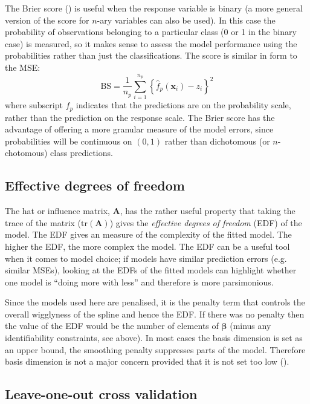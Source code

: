 The Brier score (\cite{brier50}) is useful when the response variable is binary (a more general version of the score for $n$-ary variables can also be used). In this case the probability of observations belonging to a particular class (0 or 1 in the binary case) is measured, so it makes sense to assess the model performance using the probabilities rather than just the classifications. The score is similar in form to the MSE:
\begin{equation}
\text{BS} = \frac{1}{n_p} \sum_{i=1}^{n_p} \left \{\hat{f}_p(\mathbf{x}_i)-z_i \right \}^2
\end{equation}
where subscript $f_p$ indicates that the predictions are on the probability scale, rather than the prediction on the response scale. The Brier score has the advantage of offering a more granular measure of the model errors, since probabilities will be continuous on $(0,1)$ rather than dichotomous (or $n$-chotomous) class predictions.

\subsection{Effective degrees of freedom}
\label{GAMEDF}

The hat or influence matrix, $\mathbf{A}$, has the rather useful property that taking the trace of the matrix ($\text{tr}(\mathbf{A})$) gives the \textit{effective degrees of freedom} (EDF) of the model. The EDF gives an measure of the complexity of the fitted model. The higher the EDF, the more complex the model. The EDF can be a useful tool when it comes to model choice; if models have similar prediction errors (e.g. similar MSEs), looking at the EDFs of the fitted models can highlight whether one model is ``doing more with less'' and therefore is more parsimonious.

Since the models used here are penalised, it is the penalty term that controls the overall wigglyness of the spline and hence the EDF. If there was no penalty then the value of the EDF would be the number of elements of $\bm{\beta}$ (minus any identifiability constraints, see above). In most cases the basis dimension is set as an upper bound, the smoothing penalty suppresses parts of the model. Therefore basis dimension is not a major concern provided that it is not set too low (\cite[p. 161]{simonbook}). 

\subsection{Leave-one-out cross validation}
\label{DEFN-LOOCV}

